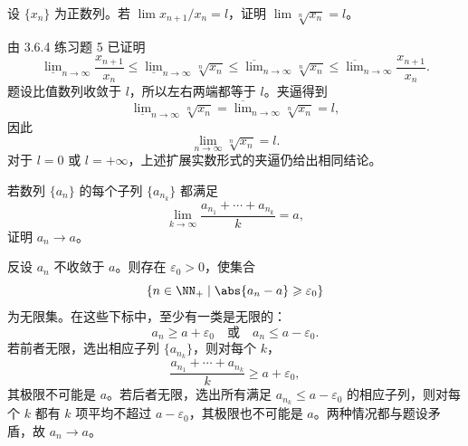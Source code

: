 \begin{xreferenceproblem}[第一组参考题 7]
设 $\{x_n\}$ 为正数列。若 $\lim x_{n+1}/x_n=l$，证明 $\lim\sqrt[n]{x_n}=l$。
\end{xreferenceproblem}
\begin{xsolution}
由 3.6.4 练习题 5 已证明
\[
  \underline{\lim}_{n\to\infty}\frac{x_{n+1}}{x_n}
  \leqslant
  \underline{\lim}_{n\to\infty}\sqrt[n]{x_n}
  \leqslant
  \overline{\lim}_{n\to\infty}\sqrt[n]{x_n}
  \leqslant
  \overline{\lim}_{n\to\infty}\frac{x_{n+1}}{x_n}.
\]
题设比值数列收敛于 $l$，所以左右两端都等于 $l$。夹逼得到
\[
  \underline{\lim}_{n\to\infty}\sqrt[n]{x_n}
  =\overline{\lim}_{n\to\infty}\sqrt[n]{x_n}=l,
\]
因此
\[
  \lim_{n\to\infty}\sqrt[n]{x_n}=l.
\]
对于 $l=0$ 或 $l=+\infty$，上述扩展实数形式的夹逼仍给出相同结论。
\end{xsolution}

\begin{xreferenceproblem}[第一组参考题 8]
若数列 $\{a_n\}$ 的每个子列 $\{a_{n_k}\}$ 都满足
\[
  \lim_{k\to\infty}\frac{a_{n_1}+\cdots+a_{n_k}}{k}=a,
\]
证明 $a_n\to a$。
\end{xreferenceproblem}
\begin{xsolution}
反设 $a_n$ 不收敛于 $a$。则存在 $\varepsilon_0>0$，使集合
\[
  \{n\in\NN_+\mid \abs{a_n-a}\geqslant\varepsilon_0\}
\]
为无限集。在这些下标中，至少有一类是无限的：
\[
  a_n\geqslant a+\varepsilon_0
  \quad\text{或}\quad
  a_n\leqslant a-\varepsilon_0.
\]
若前者无限，选出相应子列 $\{a_{n_k}\}$，则对每个 $k$，
\[
  \frac{a_{n_1}+\cdots+a_{n_k}}k\geqslant a+\varepsilon_0,
\]
其极限不可能是 $a$。若后者无限，选出所有满足 $a_{n_k}\leqslant a-\varepsilon_0$ 的相应子列，则对每个 $k$ 都有 $k$ 项平均不超过 $a-\varepsilon_0$，其极限也不可能是 $a$。两种情况都与题设矛盾，故 $a_n\to a$。
\end{xsolution}

